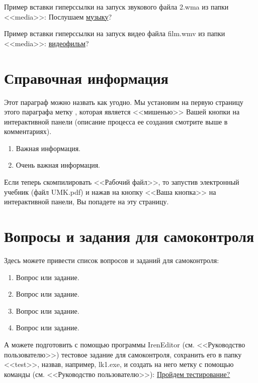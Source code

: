 Пример вставки гиперссылки на запуск звукового файла 2.wma из папки <<media>>:
Послушаем \href{run:media/2.wma}{музыку}?

Пример вставки гиперссылки на запуск видео файла film.wmv из папки <<media>>:
\href{run:media/film.avi}{видеофильм}?

\section{Справочная информация}

Этот параграф можно назвать как угодно. Мы установим на первую страницу этого параграфа
метку \label{mybutton}, которая является <<мишенью>> Вашей кнопки на интерактивной панели
(описание процесса ее создания смотрите выше в комментариях).
\begin{enumerate}%
\item Важная информация.
\item Очень важная информация.
\end{enumerate}%

Если теперь скомпилировать <<Рабочий файл>>, то запустив электронный
учебник (файл UMK.pdf) и нажав на кнопку <<Ваша кнопка>> на интерактивной
панели, Вы попадете на эту страницу.


\section*{Вопросы и задания для самоконтроля}%

Здесь можете привести список вопросов и заданий для самоконтроля:
\begin{enumerate}%
\item Вопрос или задание.
\item Вопрос или задание.
\item Вопрос или задание.
\item Вопрос или задание.
\end{enumerate}%

А можете подготовить с помощью программы IrenEditor (см. <<Руководство пользователю>>)
тестовое задание для самоконтроля, сохранить его в папку
<<test>>, назвав, например, lk1.exe, и создать на него метку с помощью
команды (см. <<Руководство пользователю>>): \href{run:test/lk1.exe}{Пройдем тестирование?}

